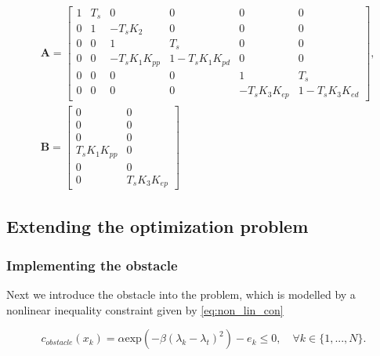 \begin{equation}\label{eq:SS_disc_ext}
    \begin{aligned}
        &\mathbf{A} =
        \begin{bmatrix} 
          1 & T_s &       0       &      0         &       0       &     0 \\
          0 &  1  &   -T_sK_2     &      0         &       0       &     0 \\ 
          0 &  0  &       1       &     T_s        &       0       &     0 \\ 
          0 &  0  & -T_sK_1K_{pp} & 1-T_sK_1K_{pd} &       0       &     0 \\
          0 &  0  &       0       &      0         &       1       &    T_s \\
          0 &  0  &       0       &      0         & -T_sK_3K_{ep} & 1-T_sK_3K_{ed}
          \end{bmatrix}, \\
        &\mathbf{B} = 
        \begin{bmatrix}
             0       &     0 \\
             0       &     0 \\
             0       &     0 \\ 
        T_sK_1K_{pp} &     0 \\
             0       &     0 \\
             0       & T_sK_3K_{ep}
        \end{bmatrix}
    \end{aligned}
\end{equation}

\subsection{Extending the optimization problem}
\subsubsection{Implementing the obstacle}

Next we introduce the obstacle into the problem, which is modelled by a nonlinear inequality constraint given by \cref{eq:non_lin_con}


\begin{equation}\label{eq:non_lin_con}
    c_{obstacle}(x_k) = \alpha \textrm{exp}(-\beta (\lambda_k - \lambda_t)^2) - e_k \leq 0, \quad \forall k \in \{1,...,N\}.
\end{equation}

